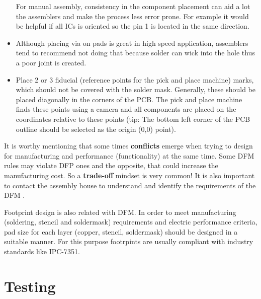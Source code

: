 \documentclass[final]{cubedoc}
\begin{document}
\begin{itemize}
		For manual assembly, consistency in the component placement can aid a lot the assemblers and make the process less error prone. For example it would be helpful if all ICs is oriented so the pin 1 is located in the same direction.
		
		\item Although placing via on pads is great in high speed application, assemblers tend to recommend not doing that because solder can wick into the hole thus a poor joint is created.
		
		
		\item Place 2 or 3 fiducial (reference points for the pick and place machine) marks, which should not be covered with the solder mask. Generally, these should be placed diagonally in the corners of the PCB. The pick and place machine finds these points using a camera and all components are placed on the coordinates relative to these points (tip: The bottom left corner of the PCB outline should be selected as the origin (0,0) point). 
		
		
	\end{itemize}
	
	It is worthy mentioning that some times \textbf{conflicts} emerge when trying to design for manufacturing and performance (functionality) at the same time. Some DFM rules may violate DFP ones and the opposite, that could increase the manufacturing cost. So a \textbf{trade-off} mindset is very common! It is also important to contact the assembly house to understand and identify the requirements of the DFM \cite{mitzner2009}.
	
	Footprint design is also related with DFM. In order to meet manufacturing (soldering, stencil and soldermask) requirements and electric performance criteria, pad size for each layer (copper, stencil, soldermask) should be designed in a suitable manner. For this purpose footrpints are usually compliant with industry standards like IPC-7351.
	
	\section{Testing}
	
\end{document}
